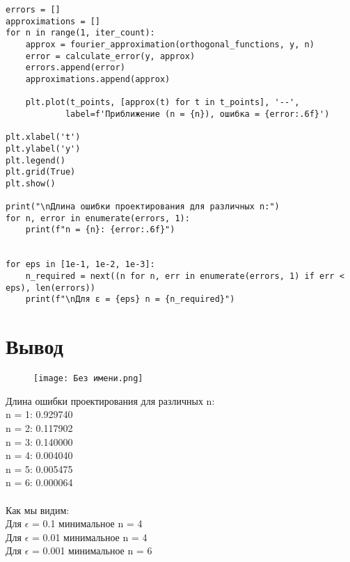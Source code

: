 \documentclass{article}
\begin{document}
\begin{verbatim}
errors = []
approximations = []
for n in range(1, iter_count):
    approx = fourier_approximation(orthogonal_functions, y, n)
    error = calculate_error(y, approx)
    errors.append(error)
    approximations.append(approx)
    
    plt.plot(t_points, [approx(t) for t in t_points], '--', 
            label=f'Приближение (n = {n}), ошибка = {error:.6f}')

plt.xlabel('t')
plt.ylabel('y')
plt.legend()
plt.grid(True)
plt.show()

print("\nДлина ошибки проектирования для различных n:")
for n, error in enumerate(errors, 1):
    print(f"n = {n}: {error:.6f}")


for eps in [1e-1, 1e-2, 1e-3]:
    n_required = next((n for n, err in enumerate(errors, 1) if err < eps), len(errors))
    print(f"\nДля ε = {eps} n = {n_required}")
\end{verbatim}
\section{Вывод}

\begin{figure}[!ht] 
    \centering
    \texttt{[image: Без имени.png]}
\end{figure}

Длина ошибки проектирования для различных n: \\
n = 1: 0.929740 \\
n = 2: 0.117902 \\
n = 3: 0.140000 \\
n = 4: 0.004040 \\
n = 5: 0.005475 \\
n = 6: 0.000064 \\
 \\
Как мы видим: \\
Для $\epsilon$ = 0.1 минимальное n = 4 \\
Для $\epsilon$ = 0.01 минимальное n = 4 \\
Для $\epsilon$ = 0.001 минимальное n = 6
\end{document}
